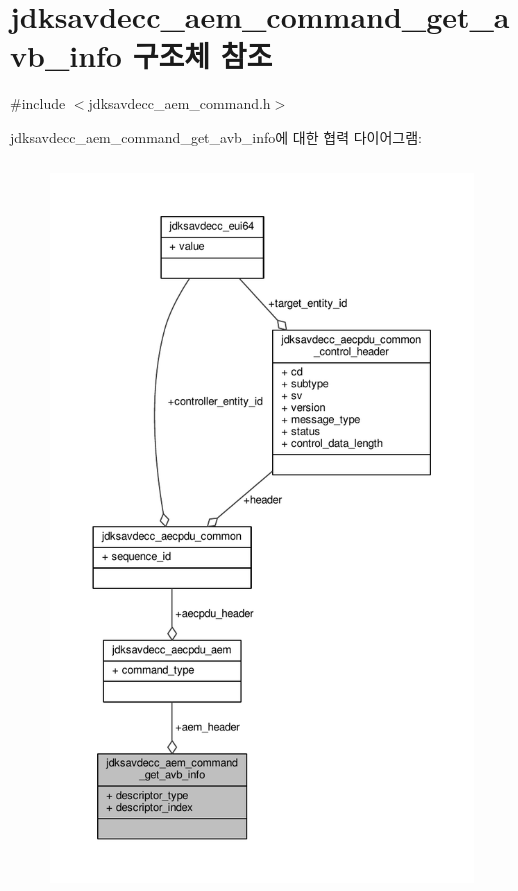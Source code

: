 \hypertarget{structjdksavdecc__aem__command__get__avb__info}{}\section{jdksavdecc\+\_\+aem\+\_\+command\+\_\+get\+\_\+avb\+\_\+info 구조체 참조}
\label{structjdksavdecc__aem__command__get__avb__info}


{\ttfamily \#include $<$jdksavdecc\+\_\+aem\+\_\+command.\+h$>$}



jdksavdecc\+\_\+aem\+\_\+command\+\_\+get\+\_\+avb\+\_\+info에 대한 협력 다이어그램\+:
\nopagebreak
\begin{figure}[H]
\begin{center}
\leavevmode
\includegraphics[height=550pt]{structjdksavdecc__aem__command__get__avb__info__coll__graph}
\end{center}
\end{figure}
